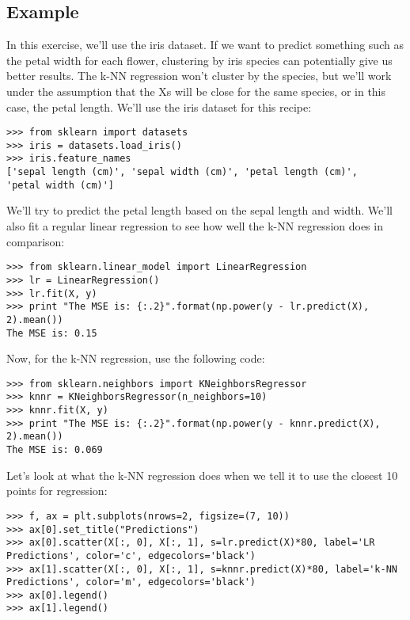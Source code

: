 \documentclass[SKL-MASTER.tex]{subfiles}
\begin{document}
\subsection*{Example}
In this exercise, we'll use the iris dataset. If we want to predict something such as the petal
width for each flower, clustering by iris species can potentially give us better results. The k-NN
regression won't cluster by the species, but we'll work under the assumption that the Xs will
be close for the same species, or in this case, the petal length.
We'll use the iris dataset for this recipe:
\begin{framed}
\begin{verbatim}
>>> from sklearn import datasets
>>> iris = datasets.load_iris()
>>> iris.feature_names
['sepal length (cm)', 'sepal width (cm)', 'petal length (cm)',
'petal width (cm)']
\end{verbatim}
\end{framed}
We'll try to predict the petal length based on the sepal length and width. We'll also fit a regular
linear regression to see how well the k-NN regression does in comparison:
\begin{framed}
	\begin{verbatim}
>>> from sklearn.linear_model import LinearRegression
>>> lr = LinearRegression()
>>> lr.fit(X, y)
>>> print "The MSE is: {:.2}".format(np.power(y - lr.predict(X),
2).mean())
The MSE is: 0.15
\end{verbatim}
\end{framed}
Now, for the k-NN regression, use the following code:
\begin{framed}
	\begin{verbatim}
>>> from sklearn.neighbors import KNeighborsRegressor
>>> knnr = KNeighborsRegressor(n_neighbors=10)
>>> knnr.fit(X, y)
>>> print "The MSE is: {:.2}".format(np.power(y - knnr.predict(X),
2).mean())
The MSE is: 0.069
\end{verbatim}
\end{framed}
Let's look at what the k-NN regression does when we tell it to use the closest 10 points
for regression:
\begin{framed}
	\begin{verbatim}
>>> f, ax = plt.subplots(nrows=2, figsize=(7, 10))
>>> ax[0].set_title("Predictions")
>>> ax[0].scatter(X[:, 0], X[:, 1], s=lr.predict(X)*80, label='LR
Predictions', color='c', edgecolors='black')
>>> ax[1].scatter(X[:, 0], X[:, 1], s=knnr.predict(X)*80, label='k-NN
Predictions', color='m', edgecolors='black')
>>> ax[0].legend()
>>> ax[1].legend()
\end{verbatim}
\end{framed}
\end{document}
